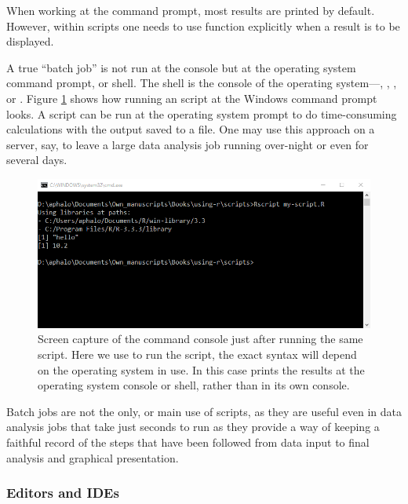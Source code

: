 \documentclass[krantz2]{krantz}\usepackage{knitr}%
\begin{document}
\begin{warningbox}
When working at the command prompt, most results are printed by default. However, within scripts one needs to use function  explicitly when a result is to be displayed.
\end{warningbox}

A true ``batch job'' is not run at the \Rpgrm console but at the operating system command prompt, or shell. The shell is the console of the operating system---, , , or . Figure \ref{fig:intro:shell} shows how running an script at the Windows command prompt looks. A script can be run at the operating system prompt to do time-consuming calculations with the output saved to a file. One may use this approach on a server, say, to leave a large data analysis job running over-night or even for several days.

\begin{figure}
  \centering
  \includegraphics[width=\linewidth]{figures/windows-cmd-script}
  \caption[Script at the Windows cmd promt]{Screen capture of the  command console just after running the same script. Here we use  to run the script, the exact syntax will depend on the operating system in use. In this case \Rpgrm prints the results at the operating system console or shell, rather than in its own \Rpgrm console.}\label{fig:intro:shell}
\end{figure}

Batch jobs are not the only, or main use of scripts, as they are useful even in data analysis jobs that take just seconds to run as they provide a way of keeping a faithful record of the steps that have been followed from data input to final analysis and graphical presentation.

\subsubsection{Editors and IDEs}
\end{document}
